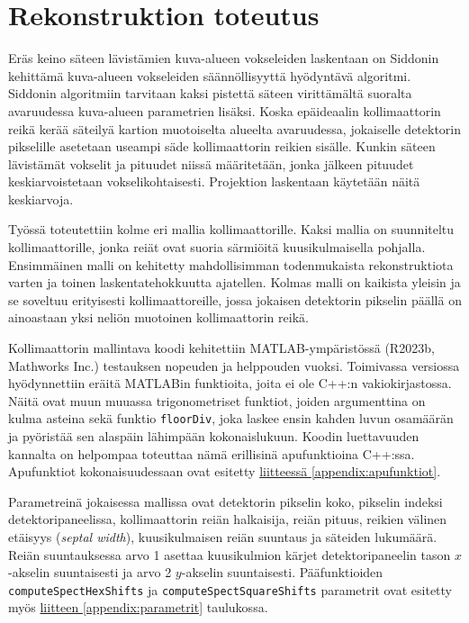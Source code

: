 \section{Rekonstruktion toteutus}
Eräs keino säteen lävistämien kuva-alueen vokseleiden laskentaan on Siddonin kehittämä kuva-alueen vokseleiden säännöllisyyttä hyödyntävä algoritmi\cite{siddon_fast_1985, sundermann_fast_1998}. Siddonin algoritmiin tarvitaan kaksi pistettä säteen virittämältä suoralta avaruudessa kuva-alueen parametrien lisäksi\cite{sundermann_fast_1998}. Koska epäideaalin kollimaattorin reikä kerää säteilyä kartion muotoiselta alueelta avaruudessa\cite{cherry_single_2012}, jokaiselle detektorin pikselille asetetaan useampi säde kollimaattorin reikien sisälle. Kunkin säteen lävistämät vokselit ja pituudet niissä määritetään, jonka jälkeen pituudet keskiarvoistetaan vokselikohtaisesti. Projektion laskentaan käytetään näitä keskiarvoja.

Työssä toteutettiin kolme eri mallia kollimaattorille. Kaksi mallia on suunniteltu kollimaattorille, jonka reiät ovat suoria särmiöitä kuusikulmaisella pohjalla. Ensimmäinen malli on kehitetty mahdollisimman todenmukaista rekonstruktiota varten ja toinen laskentatehokkuutta ajatellen. Kolmas malli on kaikista yleisin ja se soveltuu erityisesti kollimaattoreille, jossa jokaisen detektorin pikselin päällä on ainoastaan yksi neliön muotoinen kollimaattorin reikä.

Kollimaattorin mallintava koodi kehitettiin MATLAB-ympäristössä (R2023b, Mathworks Inc.) testauksen nopeuden ja helppouden vuoksi. Toimivassa versiossa hyödynnettiin eräitä MATLABin funktioita, joita ei ole C++:n vakiokirjastossa. Näitä ovat muun muuassa trigonometriset funktiot, joiden argumenttina on kulma asteina sekä funktio \texttt{floorDiv}, joka laskee ensin kahden luvun osamäärän ja pyöristää sen alaspäin lähimpään kokonaislukuun. Koodin luettavuuden kannalta on helpompaa toteuttaa nämä erillisinä apufunktioina C++:ssa. Apufunktiot kokonaisuudessaan ovat esitetty \hyperref[appendix:apufunktiot]{liitteessä \ref*{appendix:apufunktiot}}.

Parametreinä jokaisessa mallissa ovat detektorin pikselin koko, pikselin indeksi detektoripaneelissa, kollimaattorin reiän halkaisija, reiän pituus, reikien välinen etäisyys (\textit{septal width}), kuusikulmaisen reiän suuntaus ja säteiden lukumäärä. Reiän suuntauksessa arvo 1 asettaa kuusikulmion kärjet detektoripaneelin tason $x$-akselin suuntaisesti ja arvo 2 $y$-akselin suuntaisesti. Pääfunktioiden \texttt{computeSpectHexShifts} ja \texttt{computeSpectSquareShifts} parametrit ovat esitetty myös \hyperref[appendix:parametrit]{liitteen \ref*{appendix:parametrit}} taulukossa.

